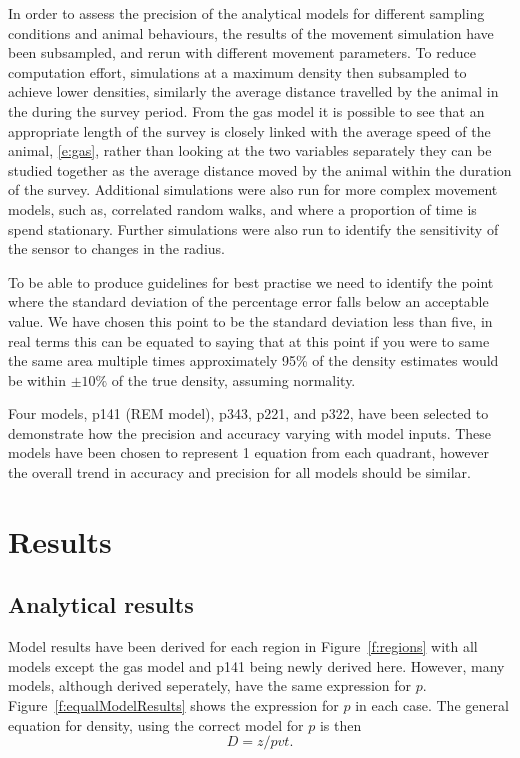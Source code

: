 \documentclass[a4paper,10pt,reqno,oneside]{amsart}
\begin{document}
In order to assess the precision of the analytical models for different sampling conditions and animal behaviours, the results of the movement simulation have been subsampled, and rerun with different movement parameters. To reduce computation effort, simulations at a maximum density then subsampled to achieve lower densities,  similarly the average distance travelled by the animal in the during the survey period. From the gas model it is possible to see that an appropriate length of the survey is closely linked with the average speed of the animal, \ref{e:gas}, rather than looking at the two variables separately they can be studied together as the average distance moved by the animal within the duration of the survey. Additional simulations were also run for more complex movement models, such as, correlated random walks, and where a proportion of time is spend stationary. Further simulations were also run to identify the sensitivity of the sensor to changes in the radius.

To be able to produce guidelines for best practise we need to identify the point where the standard deviation of the percentage error falls below an acceptable value. We have chosen this point to be the standard deviation less than five, in real terms this can be equated to saying that at this point if you were to same the same area multiple times approximately 95\% of the density estimates would be within $\pm10\%$ of the true density, assuming normality. 

Four models, p141 (REM model), p343, p221, and p322, have been selected to demonstrate how the precision and accuracy varying with model inputs. These models have been chosen to represent 1 equation from each quadrant, however the overall trend in accuracy and precision for all models should be similar.


\section{Results}

\subsection{Analytical results}

Model results have been derived for each region in Figure~\ref{f:regions} with all models except the gas model and p141 being newly derived here. However, many models, although derived seperately, have the same expression for $p$. Figure~\ref{f:equalModelResults} shows the expression for $p$ in each case. The general equation for density, using the correct model for $p$ is then
\begin{equation}
\label{e:D}
	D = z/pvt.
\end{equation}
\end{document}

